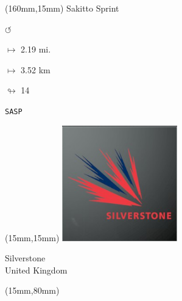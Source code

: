 \begin{textblock*}{40mm}(160mm,15mm)%
Sakitto Sprint
\par \Huge$\circlearrowleft$
\Large
\par$\mapsto$ 2.19 mi.
\par$\mapsto$ 3.52 km
\par$\looparrowright$ 14
\par\hfill\tiny\tt SASP\\
\end{textblock*}
\null\newpage

\begin{textblock*}{50mm}(15mm,15mm)%
\includegraphics[width=50mm]{LG/2015-05-20_00094.png}
\par Silverstone\\ United Kingdom
\end{textblock*}
\begin{textblock*}{185mm}(15mm,80mm)%
\end{textblock*}
